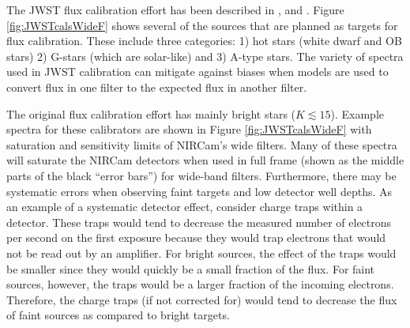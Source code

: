 \documentclass{aastex6}
\begin{document}
The JWST flux calibration effort has been described in \citet{gordon2009fluxplan1}, \citet{gordon2011fluxplan2} and \citet{gordon2022absFlux1}.
Figure \ref{fig:JWSTcalsWideF} shows several of the sources that are planned as targets for flux calibration.
These include three categories: 1) hot stars (white dwarf and OB stars) 2) G-stars (which are solar-like) and 3) A-type stars.
The variety of spectra used in JWST calibration can mitigate against biases when models are used to convert flux in one filter to the expected flux in another filter.

The original flux calibration effort has mainly bright stars ($K \lesssim 15$).
Example spectra for these calibrators are shown in Figure \ref{fig:JWSTcalsWideF} with saturation and sensitivity limits of NIRCam's wide filters.
Many of these spectra will saturate the NIRCam detectors when used in full frame (shown as the middle parts of the black ``error bars'') for wide-band filters.
Furthermore, there may be systematic errors when observing faint targets and low detector well depths.
As an example of a systematic detector effect, consider charge traps within a detector.
These traps would tend to decrease the measured number of electrons per second on the first exposure because they would trap electrons  that would not be read out by an amplifier.
For bright sources, the effect of the traps would be smaller since they would quickly be a small fraction of the flux.
For faint sources, however, the traps would be a larger fraction of the incoming electrons.
Therefore, the charge traps (if not corrected for) would tend to decrease the flux of faint sources as compared to bright targets.
\end{document}
